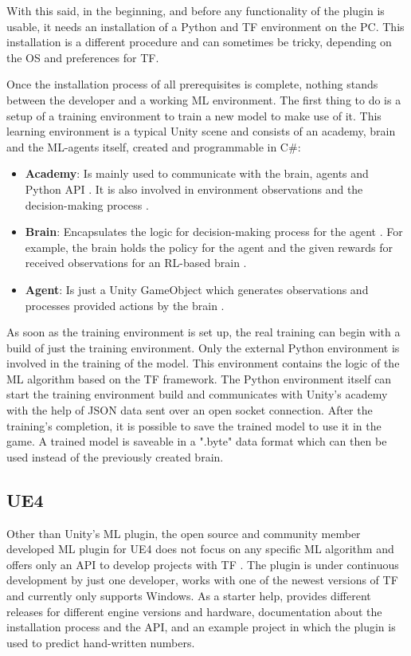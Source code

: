 \documentclass[MGS,Master,english]{twbook}%
\begin{document}
With this said, in the beginning, and before any functionality of the plugin is usable, it needs an installation of a Python and \ac{TF} environment on the \ac{PC}. This installation is a different procedure and can sometimes be tricky, depending on the \ac{OS} and preferences for \ac{TF}.

Once the installation process of all prerequisites is complete, nothing stands between the developer and a working \ac{ML} environment. The first thing to do is a setup of a training environment to train a new model to make use of it. This learning environment is a typical Unity scene and consists of an academy, brain and the \ac{ML}-agents itself, created and programmable in C\#:
\begin{itemize}
	\item \textbf{Academy}: Is mainly used to communicate with the brain, agents and Python \ac{API} \cite{unity::mlGithub}. It is also involved in environment observations and the decision-making process \cite{unity::mlGithub}. 
	\item \textbf{Brain}: Encapsulates the logic for decision-making process for the agent \cite{unity::mlGithub}. For example, the brain holds the policy for the agent and the given rewards for received observations for an \ac{RL}-based brain \cite{unity::mlGithub}.
	\item \textbf{Agent}: Is just a Unity GameObject which generates observations and processes provided actions by the brain \cite{unity::mlGithub}.
\end{itemize}  
As soon as the training environment is set up, the real training can begin with a build of just the training environment. Only the external Python environment is involved in the training of the model. This environment contains the logic of the \ac{ML} algorithm based on the \ac{TF} framework. The Python environment itself can start the training environment build and communicates with Unity’s academy with the help of \ac{JSON} data sent over an open socket connection. After the training's completion, it is possible to save the trained model to use it in the game. A trained model is saveable in a ".byte" data format which can then be used instead of the previously created brain.

\subsection{\acl{UE4}}
Other than Unity’s \ac{ML} plugin, the open source and community member developed \ac{ML} plugin for \ac{UE4} does not focus on any specific \ac{ML} algorithm and offers only an \ac{API} to develop projects with \ac{TF} \cite{ue4::tensorFlowPlugin}. The plugin is under continuous development by just one developer, works with one of the newest versions of \ac{TF} and currently only supports Windows. As a starter help, \citep{ue4::tensorFlowPlugin} provides different releases for different engine versions and hardware, documentation about the installation process and the \ac{API}, and an example project in which the plugin is used to predict hand-written numbers.
\end{document}
